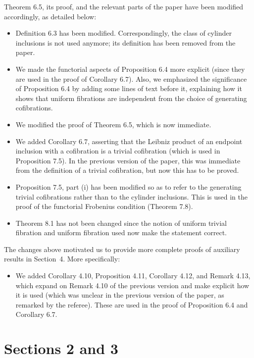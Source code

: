 \documentclass[reqno,10pt,a4paper,oneside,draft]{amsart}
\begin{document}
Theorem 6.5, its proof, and the relevant parts of the paper have been modified accordingly, as detailed below:

\begin{itemize} 
\item Definition 6.3 has been modified. Correspondingly, the class of cylinder inclusions is not used anymore;
its definition has been removed from the paper. 
\item We made the functorial aspects of Proposition 6.4 more explicit  (since they are used in the proof of Corollary 6.7). 
Also, we emphasized the significance of Proposition 6.4 by adding some lines of text before it, explaining how it shows that uniform fibrations are independent from the choice of generating cofibrations. 
\item We modified the proof of Theorem 6.5, which is now immediate. 
\item We added Corollary 6.7, asserting that the Leibniz product of an endpoint inclusion with a cofibration is
a trivial cofibration (which is used in Proposition 7.5).  In the previous version of the paper, this was immediate from the definition of a trivial cofibration, but now this has to be proved. 
\item Proposition 7.5, part (i) has been modified so as to refer to the generating trivial cofibrations rather than to the cylinder inclusions. This is used in the proof of the functorial Frobenius condition (Theorem 7.8).
\item Theorem 8.1 has not been changed since the notion of uniform trivial fibration and uniform fibration used now
make the statement correct. 
\end{itemize} 

The changes above motivated us to provide more complete proofs of auxiliary results in Section~4. More specifically: 
\begin{itemize}
\item We added Corollary 4.10, Proposition 4.11, Corollary 4.12, and Remark 4.13, which expand on Remark 4.10 of the previous version and make explicit how it is used (which was unclear in the previous version of the paper, as remarked by the referee). These are used in the proof of 
Proposition 6.4 and Corollary 6.7. 
\end{itemize}


\section*{Sections 2 and 3} 
\end{document}
